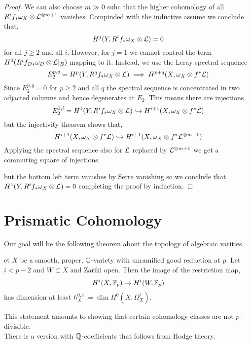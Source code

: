 \documentclass[12pt]{article}
\begin{document}
\begin{proof}
We can also choose $m \gg 0$ suhc that the higher cohomology of all $R^i f_* \omega_X \otimes \mathcal{L}^{\otimes m+1}$ vanishes. Compinded with the inductive assume we conclude that,
\[ H^j(Y, R^i f_* \omega_X \otimes \mathcal{L}) = 0 \]
for all $j \ge 2$ and all $i$. However, for $j = 1$ we cannot control the term $H^0(R^i f_{D*} \omega_D \otimes \mathcal{L}|_B)$ mapping to it. Instead, we use the Leray spectral sequence
\[ E^{p,q}_2 = H^p(Y, R^q f_* \omega_X \otimes \mathcal{L}) \implies H^{p+q}(X, \omega_X \otimes f^* \mathcal{L}) \]
Since $E^{p,q}_2 = 0$ for $p \ge 2$ and all $q$ the spectral sequence is concentrated in two adjacted columns and hence degenerates at $E_2$. This means there are injections
\[ E_2^{1,i} = H^1(Y, R^i f_* \omega_X \otimes \mathcal{L}) \hookrightarrow H^{i+1}(X, \omega_X \otimes f^* \mathcal{L}) \]
but the injectivity theorem shows that,
\[ H^{i+1}(X, \omega_X \otimes f^* \mathcal{L}) \hookrightarrow H^{i+1}(X, \omega_X \otimes f^* \mathcal{L}^{\otimes m + 1}) \]
Applying the spectral sequence also for $\mathcal{L}$ replaced by $\mathcal{L}^{\otimes m+1}$ we get a commuting square of injections
\begin{center}
\end{center}
but the bottom left term vanishes by Serre vanishing so we conclude that $H^1(Y, R^i f_* \omega_X \otimes \mathcal{L}) = 0$ completing the proof by induction.
\end{proof}


\section{Prismatic Cohomology}

\newcommand{\BDel}{\Delta}
\newcommand{\LL}{\mathbb{L}}
\newcommand{\ad}{\mathrm{ad}}

Our goal will be the following theorem about the topology of algebraic varities. 

\begin{theorem}
et $X$ be a smooth, proper, $\mathbb{C}$-variety with unramified good reduction at $p$. Let $i < p - 2$ and $W \subset X$ and Zariki open. Then the image of the restriction map,
\[ H^i(X, \mathbb{F}_p) \to H^i(W, \mathbb{F}_p) \]
has dimension at least $h_X^{0,i} := \dim H^0(X, \Omega_X^i)$.
\end{theorem}

This statement amounts to showing that certain cohomology classes are not $p$-divisible.
\bigskip\\
There is a version with $\mathbb{Q}$-coefficients that follows from Hodge theory.
\end{document}
